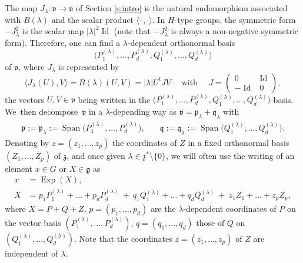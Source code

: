 \documentclass[10pt]{amsart}
\DeclareMathOperator{\Exp}{Exp}
\DeclareMathOperator{\Id}{Id}
\DeclareMathOperator{\Span}{Span}
\theoremstyle{plain}
\theoremstyle{definition}
\begin{document}
The map $J_\lambda:\mathfrak v\to \mathfrak v$ of Section \ref{s:intro} is the natural endomorphism associated with $B(\lambda)$ and the scalar product $\langle \cdot\,,\cdot\rangle$.
In $H$-type groups,
the symmetric form $-J_\lambda^2$ is the scalar map $|\lambda|^2 \Id$ (note that $-J_\lambda^2$ is always a non-negative symmetric form).
Therefore, one can find a $\lambda$-dependent orthonormal basis
\[
\bigl (P_1^{(\lambda)}, \dots,P_d^{(\lambda)}, Q_1^{(\lambda)}, \dots,Q_d^{(\lambda)} \bigr)
\]
of $\mathfrak v$, where $J_\lambda$ is represented by
\[
\langle J_\lambda(U),V\rangle=B(\lambda)(U,V)= |\lambda| U^t JV\quad \mbox{ with }\quad
J=\begin{pmatrix}0 & \Id \\ -\Id & 0\end{pmatrix},
\]
the vectors $U,V\in \mathfrak v$ being written in the $\bigl (P_1^{(\lambda)}, \dots,P_d^{(\lambda)}, Q_1^{(\lambda)}, \dots,Q_d^{(\lambda)} \bigr)$-basis.
We~then decompose~$ \mathfrak v$ in a $\lambda$-depending way as
$ \mathfrak v = \mathfrak p_\lambda+ \mathfrak q_\lambda$
with
\[
\begin{aligned}
\mathfrak p:=\mathfrak p_\lambda:= \Span \big (P_1^{(\lambda)}, \dots,P_d^{(\lambda)} \big), & \quad \mathfrak q:=\mathfrak q_\lambda:= \Span \big (Q_1^{(\lambda)}, \dots,Q_d^{(\lambda)}\big).
\end{aligned}
\]
Denoting by $z=(z_1,\dots,z_p)$ the coordinates of $Z$ in a fixed orthonormal basis $(Z_1,\dots, Z_p)$ of $\mathfrak z$, and once given $\lambda\in\mathfrak z^*\setminus\{0\}$,
we will often use the writing of an element $x\in G$ or $X\in \mathfrak g$ as
\begin{equation}
\label{eqxpqz}
\begin{split}
x&=\Exp(X),\\
X&=p_1P_1^{(\lambda)} +\ldots + p_dP_d^{(\lambda)} \ + \ q_1Q_1^{(\lambda)} + \ldots + q_d Q_d ^{(\lambda)}\ + \ z_1 Z_1 +\ldots + z_p Z_p,
\end{split}
\end{equation}
where $X=P+Q+Z$, $p=(p_1,\dots,p_d)$ are the $\lambda$-dependent coordinates of $P$ on the vector basis $(P_1^{(\lambda)},\dots,P_d^{(\lambda)})$, $q=(q_1,\dots,q_d)$ those of $Q$ on $(Q_1^{(\lambda)},\dots,Q_d^{(\lambda)})$. Note that the coordinates $z=(z_1,\dots, z_p)$ of $Z$ are independent of $\lambda$.
\end{document}
